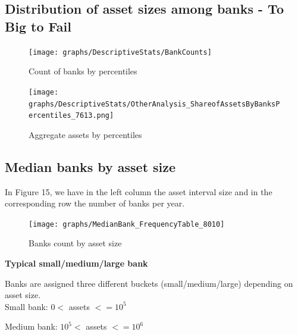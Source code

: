 \documentclass[12pt, a4paper]{article} %
\begin{document}
\newpage

\subsection{Distribution of asset sizes among banks - To Big to Fail}

\begin{figure}[hbtp]
\centering
\caption{Count of banks by percentiles}
\texttt{[image: graphs/DescriptiveStats/BankCounts]}
\end{figure}

\newpage

\begin{figure}[hbtp]
\centering
\caption{Aggregate assets by percentiles}
\texttt{[image: graphs/DescriptiveStats/OtherAnalysis\_ShareofAssetsByBanksPercentiles\_7613.png]}
\end{figure}

\subsection{Median banks by asset size}

In Figure 15, we have in the left column the asset interval size and in the corresponding row the number of banks per year.\\

\begin{figure}[hbtp]
\centering
\caption{Banks count by asset size}
\texttt{[image: graphs/MedianBank\_FrequencyTable\_8010]}
\end{figure}


\textbf{Typical small/medium/large bank}

Banks are assigned three different buckets (small/medium/large) depending on asset size.\\

Small bank: $0<$ assets $<= 10^5$

Medium bank: $10^5<$ assets $<= 10^6$
\end{document}
